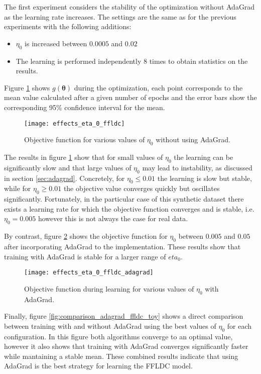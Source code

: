 The first experiment considers the stability of the optimization without AdaGrad as the learning rate increases. The settings are the same as for the previous experiments with the following additions:

\begin{itemize}
  \item $\eta_{0}$ is increased between $0.0005$ and $0.02$
  \item The learning is performed independently 8 times to obtain statistics on the results.
\end{itemize}

Figure \ref{fig:effects_eta_0} shows $g(\boldsymbol{\theta})$ during the optimization, each point corresponds to the mean value calculated after a given number of epochs and the error bars show the corresponding 95\% confidence interval for the mean.

\begin{figure}
  \centering
  \texttt{[image: effects\_eta\_0\_ffldc]}
  \caption{Objective function for various values of $\eta_0$ without using AdaGrad.}
  \label{fig:effects_eta_0}
\end{figure}

The results in figure \ref{fig:effects_eta_0} show that for small values of $\eta_0$ the learning can be significantly slow and that large values of $\eta_0$ may lead to instability, as discussed in section \ref{sec:adagrad}. Concretely, for $\eta_{0} \leq 0.01$ the learning is slow but stable, while for $\eta_{0} \geq 0.01$ the objective value converges quickly but oscillates significantly. Fortunately, in the particular case of this synthetic dataset there exists a learning rate for which the objective function converges and is stable, i.e. $\eta_{0} = 0.005$ however this is not always the case for real data.

By contrast, figure \ref{fig:effects_adagrad} shows the objective function for $\eta_{0}$ between $0.005$ and $0.05$ after incorporating AdaGrad to the implementation. These results show that training with AdaGrad is stable for a larger range of $eta_0$.

\begin{figure}
  \centering
  \texttt{[image: effects\_eta\_0\_ffldc\_adagrad]}
  \caption{Objective function during learning for various values of $\eta_0$ with AdaGrad.}
  \label{fig:effects_adagrad}
\end{figure}

Finally, figure \ref{fig:comparison_adagrad_ffldc_toy} shows a direct comparison between training with and without AdaGrad using the best values of $\eta_0$ for each configuration. In this figure both algorithms converge to an optimal value, however it also shows that training with AdaGrad converges significantly faster while mantaining a stable mean. These combined results indicate that using AdaGrad is the best strategy for learning the FFLDC model.

